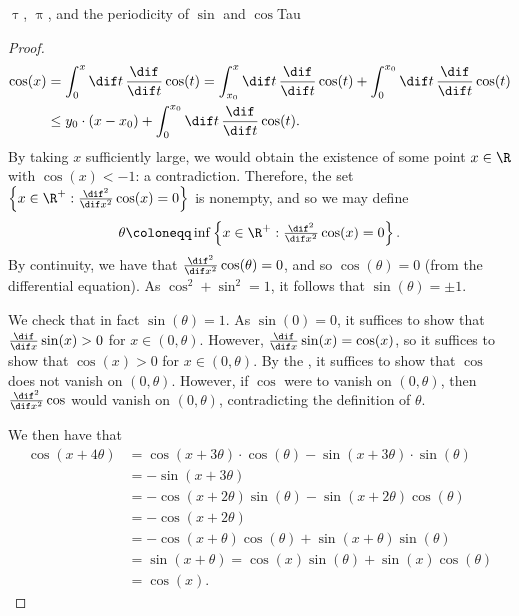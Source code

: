 \begin{prp}{$\uptau$, $\uppi$, and the periodicity of $\sin$ and $\cos$}{Tau}
\begin{proof}
\begin{equation}
\begin{split}
\cos (x) & =\int _0^x\dif t\, \frac{\dif}{\dif t}\cos (t)=\int _{x_0}^x\dif t\, \frac{\dif}{\dif t}\cos (t)+\int _0^{x_0}\dif t\, \frac{\dif}{\dif t}\cos (t) \\
& \leq y_0\cdot (x-x_0)+\int _0^{x_0}\dif t\, \frac{\dif}{\dif t}\cos (t).
\end{split}
\end{equation}
By taking $x$ sufficiently large, we would obtain the existence of some point $x\in \R$ with $\cos (x)<-1$:  a contradiction.  Therefore, the set $\left\{ x\in \R ^+:\frac{\dif ^2}{\dif x^2}\cos (x)=0\right\}$ is nonempty, and so we may define
\begin{equation}
\theta \coloneqq \inf \left\{ x\in \R ^+:\tfrac{\dif ^2}{\dif x^2}\cos (x)=0\right\} .
\end{equation}
By continuity, we have that $\frac{\dif ^2}{\dif x^2}\cos (\theta )=0$, and so $\cos (\theta )=0$ (from the differential equation).  As $\cos ^2+\sin ^2=1$, it follows that $\sin (\theta )=\pm 1$.

We check that in fact $\sin (\theta )=1$.  As $\sin (0)=0$, it suffices to show that $\frac{\dif}{\dif x}\sin (x)>0$ for $x\in (0,\theta )$.  However, $\frac{\dif}{\dif x}\sin (x)=\cos (x)$, so it suffices to show that $\cos (x)>0$ for $x\in (0,\theta )$.  By the , it suffices to show that $\cos$ does not vanish on $(0,\theta )$.  However, if $\cos$ were to vanish on $(0,\theta )$, then $\frac{\dif ^2}{\dif x^2}\cos$ would vanish on $(0,\theta )$, contradicting the definition of $\theta$.

We then have that
\begin{equation}
\begin{split}
\cos (x+4\theta ) & =\cos (x+3\theta )\cdot \cos (\theta )-\sin (x+3\theta )\cdot \sin (\theta ) \\
& =-\sin (x+3\theta ) \\
& =-\cos (x+2\theta )\sin (\theta )-\sin (x+2\theta )\cos (\theta ) \\
& =-\cos (x+2\theta ) \\
& =-\cos (x+\theta )\cos (\theta )+\sin (x+\theta )\sin (\theta ) \\
& =\sin (x+\theta )=\cos (x)\sin (\theta )+\sin (x)\cos (\theta ) \\
& =\cos (x).
\end{split}
\end{equation}


\end{proof}
\end{prp}
